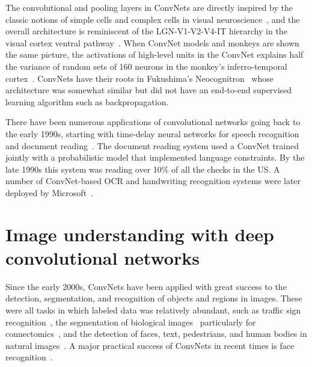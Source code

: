 \documentclass[10pts]{article}
\begin{document}
The convolutional and pooling layers in ConvNets are directly inspired
by the classic notions of simple cells and complex cells in visual
neuroscience~\citep{Hubel62}, and the overall architecture is
reminiscent of the LGN-V1-V2-V4-IT hierarchy in the visual cortex 
ventral pathway~\citep{Felleman+VanEssen-1991}. When ConvNet models and
monkeys are shown the same picture, the activations of high-level
units in the ConvNet explains half the variance of random sets of 160
neurons in the monkey's
inferro-temporal cortex~\citep{cadieu-plos-2014}. ConvNets have their roots
in Fukushima's Neocognitron~\citep{fukushima-82} whose architecture
was somewhat similar but did not have an end-to-end supervised
learning algorithm such as backpropagation. 

There have been numerous applications of convolutional networks going
back to the early 1990s, starting with time-delay neural networks for
speech recognition and document reading~\citep{lecun-98}. 
The document reading system used a ConvNet trained jointly with
a probabilistic model that implemented language constraints. By the
late 1990s this system was reading over 10\% of all the checks in the
US. A number of ConvNet-based OCR and handwriting recognition systems
were later deployed by
Microsoft~\citep{simard-03}.

\section{Image understanding with deep convolutional networks}

Since the early 2000s, ConvNets have been applied with great 
success to the detection, segmentation, and
recognition of objects and regions in images. These were all
tasks in which labeled data was relatively abundant, such as traffic
sign recognition~\cite{sermanet-ijcnn-11,Ciresan-et-al-2012}, the
segmentation of biological images~\cite{ning-05} particularly for
connectomics~\cite{Turaga2010}, and the detection of faces, text,
pedestrians, and human bodies in natural
images~\cite{vaillant-monrocq-lecun-94,nowlan-platt-95,garcia-delakis-04,osadchy-07,nasse-09,fan-pami-2010,sermanet-cvpr-13,tompson-cvpr-15}.
A major practical success of ConvNets in recent times is face
recognition~\citep{taigman-cvpr-2014}. 
\end{document}
